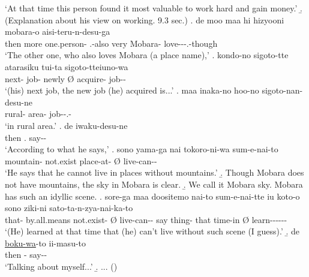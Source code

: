 		`At that time this person found it most valuable to work hard and gain money.'
 \b. (Explanation about his view on working. 9.3 sec.)
 \bg. de moo  maa  hi hizyooni mobara-o aisi-teru-n-desu-ga \\
 	then more one.person-  .-also  very Mobara- love---.-though \\
	`The other one, who also loves Mobara (a place name),'
 \bg. kondo-no sigoto-tte atarasiku \EM{\O} tui-ta sigoto-tteiuno-wa \\
 		next- job- newly {\O} acquire- job-- \\
		`(his) next job, the new job (he) acquired is...'
 \bg. maa inaka-no hoo-no sigoto-nan-desu-ne \\
 	 rural- area- job--.- \\
	`in rural area.'
 \bg. de  iwaku-desu-ne \\
 	then . say-- \\
	`According to what he says,'
 \bg. sono yama-ga nai tokoro-ni-wa \EM{\O} sum-e-nai-to \\
 	 mountain- not.exist place-at- {\O} live-can-- \\
 	`He says that he cannot live in places without mountains.'
 \b. Though Mobara does not have mountains, the sky in Mobara is clear.
 \b. We call it Mobara sky. Mobara has such an idyllic scene.
 \bg. sore-ga maa doositemo nai-to \EM{\O} sum-e-nai-tte iu koto-o sono ziki-ni \EM{\O} sato-ta-n-zya-nai-ka-to \\
 	that-  by.all.means not.exist- {\O} live-can-- say thing- that time-in {\O} learn------ \\
	`(He) learned at that time that (he) can't live without such scene (I guess).'
 \b. de \ul{\ul{boku-wa}}-to ii-masu-to \\
 	then - say-- \\
	`Talking about myself...'
 \b. ...
   \hfill{()}
